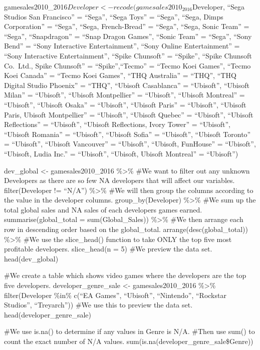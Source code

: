 \documentclass[
]{article}
\begin{document}
gamesales2010\_2016\(Developer <- recode(gamesales2010_2016\)Developer,
``Sega Studios San Francisco'' = ``Sega'', ``Sega Toys'' = ``Sega'',
``Sega, Dimps Corporation'' = ``Sega'', ``Sega, French-Bread'' =
``Sega'', ``Sega, Sonic Team'' = ``Sega'', ``Snapdragon'' = ``Snap
Dragon Games'', ``Sonic Team'' = ``Sega'', ``Sony Bend'' = ``Sony
Interactive Entertainment'', ``Sony Online Entertainment'' = ``Sony
Interactive Entertainment'', ``Spike Chunsoft'' = ``Spike'', ``Spike
Chunsoft Co.~Ltd., Spike Chunsoft'' = ``Spike'',``Tecmo'' = ``Tecmo Koei
Games'', ``Tecmo Koei Canada'' = ``Tecmo Koei Games'', ``THQ Australia''
= ``THQ'', ``THQ Digital Studio Phoenix'' = ``THQ'', ``Ubisoft
Casablanca'' = ``Ubisoft'', ``Ubisoft Milan'' = ``Ubisoft'', ``Ubisoft
Montpellier'' = ``Ubisoft'', ``Ubisoft Montreal'' = ``Ubisoft'',
``Ubisoft Osaka'' = ``Ubisoft'', ``Ubisoft Paris'' = ``Ubisoft'',
``Ubisoft Paris, Ubisoft Montpellier'' = ``Ubisoft'', ``Ubisoft Quebec''
= ``Ubisoft'', ``Ubisoft Reflections'' = ``Ubisoft'', ``Ubisoft
Reflections, Ivory Tower'' = ``Ubisoft'', ``Ubisoft Romania'' =
``Ubisoft'', ``Ubisoft Sofia'' = ``Ubisoft'', ``Ubisoft Toronto'' =
``Ubisoft'', ``Ubisoft Vancouver'' = ``Ubisoft'', ``Ubisoft, FunHouse''
= ``Ubisoft'', ``Ubisoft, Ludia Inc.'' = ``Ubisoft'', ``Ubisoft, Ubisoft
Montreal'' = ``Ubisoft'')

dev\_global \textless- gamesales2010\_2016 \%\textgreater\% \#We want to
filter out any unknown Developers as there are so few NA developers that
will affect our variables. filter(Developer != ``N/A'') \%\textgreater\%
\#We will then group the columns according to the value in the developer
columns. group\_by(Developer) \%\textgreater\% \#We sum up the total
global sales and NA sales of each developers games earned.
summarise(global\_total = sum(Global\_Sales)) \%\textgreater\% \#We then
arrange each row in descending order based on the global\_total.
arrange(desc(global\_total)) \%\textgreater\% \#We use the slice\_head()
function to take ONLY the top five most profitable developers.
slice\_head(n = 5) \#We preview the data set. head(dev\_global)

\#We create a table which shows video games where the developers are the
top five developers. developer\_genre\_sale \textless-
gamesales2010\_2016 \%\textgreater\% filter(Developer \%in\% c(``EA
Games'', ``Ubisoft'', ``Nintendo'', ``Rockstar Studios'', ``Treyarch''))
\#We use this to preview the data set. head(developer\_genre\_sale)

\#We use is.na() to determine if any values in Genre is N/A. \#Then use
sum() to count the exact number of N/A values.
sum(is.na(developer\_genre\_sale\$Genre))
\end{document}
